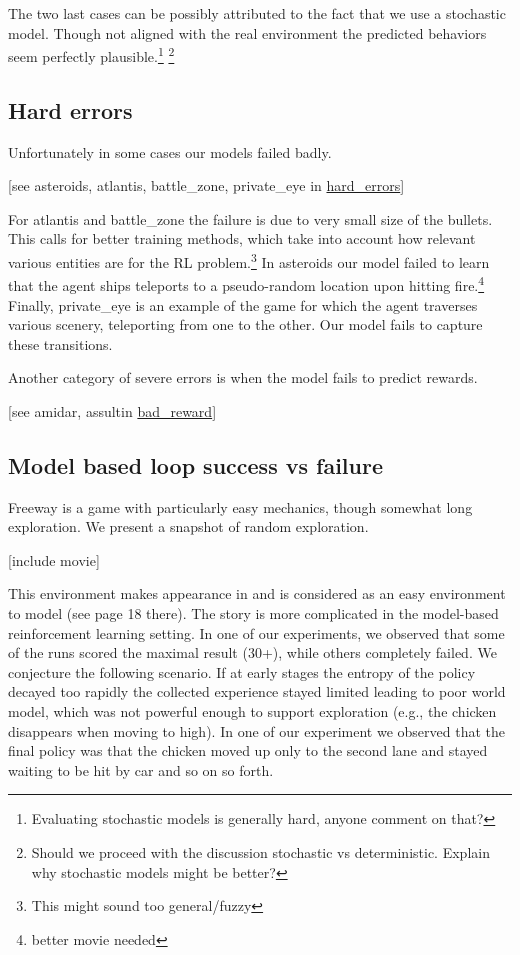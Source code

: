 \documentclass[12pt]{article}
\begin{document}
The two last cases can be possibly attributed to the fact that we use a stochastic model. Though not aligned with the real environment the predicted behaviors seem perfectly plausible.\footnote{Evaluating stochastic models is generally hard, anyone comment on that?} \footnote{Should we proceed with the discussion stochastic vs deterministic. Explain why stochastic models might be better?} 

\subsection{Hard errors}
Unfortunately in some cases our models failed badly. 

[see asteroids, atlantis, battle\_zone, private\_eye in \href{https://drive.google.com/open?id=1Y9jlYk-UkrmJY1rcEU9MnXr1iaW25lGI}{hard\_errors}]

For atlantis and battle\_zone the failure is due to very small size of the bullets. This calls for better training methods, which take into account how relevant various entities are for the RL problem.\footnote{This might sound too general/fuzzy} In asteroids our model failed to learn that the agent ships teleports to a pseudo-random location upon hitting fire.\footnote{better movie needed} Finally, private\_eye is an example of the game for which the agent traverses various scenery, teleporting from one to the other. Our model fails to capture these transitions. 

Another category of severe errors is when the model fails to predict rewards.

[see amidar, assultin \href{https://drive.google.com/open?id=1yn9xk1Ir365g7bD2YtnbY8eoEEl9CDfF}{bad_reward}]

\subsection{Model based loop success vs failure}
Freeway is a game with particularly easy mechanics, though somewhat long exploration. We present a snapshot of random exploration.

[include movie]

This environment makes appearance in \cite{recurrent} and is considered as an easy environment to model (see page 18 there). The story is more complicated in the model-based reinforcement learning setting. In one of our experiments, we observed that some of the runs scored the maximal result ($30$+), while others completely failed. We conjecture the following scenario. If at early stages the entropy of the policy decayed too rapidly the collected experience stayed limited leading to poor world model, which was not powerful enough to support exploration (e.g., the chicken disappears when moving to high). In one of our experiment we observed that the final policy was that the chicken moved up only to the second lane and stayed waiting to be hit by car and so on so forth. 
\end{document}
